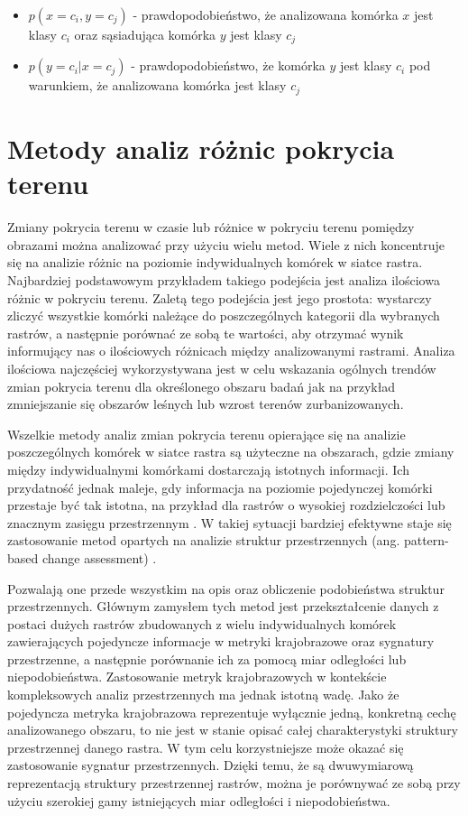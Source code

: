 \documentclass{amuthesis}
\begin{document}
\begin{itemize}
\item
  \(p(x=c_i, y=c_j)\) - prawdopodobieństwo, że analizowana komórka \(x\)
  jest klasy \(c_i\) oraz sąsiadująca komórka \(y\) jest klasy \(c_j\)
\item
  \(p(y=c_i | x=c_j)\) - prawdopodobieństwo, że komórka \(y\) jest klasy
  \(c_i\) pod warunkiem, że analizowana komórka jest klasy \(c_j\)
\end{itemize}

\hypertarget{sec-pattern-based}{%
\section{Metody analiz różnic pokrycia terenu}\label{sec-pattern-based}}

Zmiany pokrycia terenu w czasie lub różnice w pokryciu terenu pomiędzy
obrazami można analizować przy użyciu wielu metod. Wiele z nich
koncentruje się na analizie różnic na poziomie indywidualnych komórek w
siatce rastra. Najbardziej podstawowym przykładem takiego podejścia jest
analiza ilościowa różnic w pokryciu terenu. Zaletą tego podejścia jest
jego prostota: wystarczy zliczyć wszystkie komórki należące do
poszczególnych kategorii dla wybranych rastrów, a następnie porównać ze
sobą te wartości, aby otrzymać wynik informujący nas o ilościowych
różnicach między analizowanymi rastrami. Analiza ilościowa najczęściej
wykorzystywana jest w celu wskazania ogólnych trendów zmian pokrycia
terenu dla określonego obszaru badań jak na przykład zmniejszanie się
obszarów leśnych lub wzrost terenów zurbanizowanych.

Wszelkie metody analiz zmian pokrycia terenu opierające się na analizie
poszczególnych komórek w siatce rastra są użyteczne na obszarach, gdzie
zmiany między indywidualnymi komórkami dostarczają istotnych informacji.
Ich przydatność jednak maleje, gdy informacja na poziomie pojedynczej
komórki przestaje być tak istotna, na przykład dla rastrów o wysokiej
rozdzielczości lub znacznym zasięgu przestrzennym
\autocite{Jasiewicz_GeoPAT}. W takiej sytuacji bardziej efektywne staje
się zastosowanie metod opartych na analizie struktur przestrzennych
(ang. pattern-based change assessment) \autocite{Netzel2015}.

Pozwalają one przede wszystkim na opis oraz obliczenie podobieństwa
struktur przestrzennych. Głównym zamysłem tych metod jest
przekształcenie danych z postaci dużych rastrów zbudowanych z wielu
indywidualnych komórek zawierających pojedyncze informacje w metryki
krajobrazowe oraz sygnatury przestrzenne, a następnie porównanie ich za
pomocą miar odległości lub niepodobieństwa. Zastosowanie metryk
krajobrazowych w kontekście kompleksowych analiz przestrzennych ma
jednak istotną wadę. Jako że pojedyncza metryka krajobrazowa
reprezentuje wyłącznie jedną, konkretną cechę analizowanego obszaru, to
nie jest w stanie opisać całej charakterystyki struktury przestrzennej
danego rastra. W tym celu korzystniejsze może okazać się zastosowanie
sygnatur przestrzennych. Dzięki temu, że są dwuwymiarową reprezentacją
struktury przestrzennej rastrów, można je porównywać ze sobą przy użyciu
szerokiej gamy istniejących miar odległości i niepodobieństwa.
\end{document}
